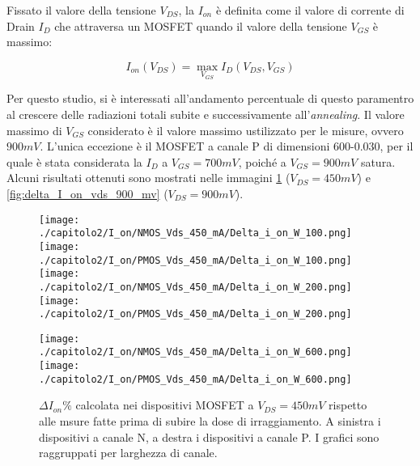 Fissato il valore della tensione $V_{DS}$, la $I_{on}$ è definita come il valore di corrente di Drain $I_D$ che attraversa un MOSFET quando il valore della tensione $V_{GS}$ è massimo:

\begin{equation}
    I_{on}(V_{DS}) = \max_{V_{GS}} I_D(V_{DS},V_{GS})
\end{equation}

Per questo studio, si è interessati all'andamento percentuale di questo paramentro al crescere delle radiazioni totali subite e successivamente all'\emph{annealing}. Il valore massimo di $V_{GS}$ considerato è il valore massimo ustilizzato per le misure, ovvero $900 mV$. L'unica eccezione è il MOSFET a canale P di dimensioni 600-0.030, per il quale è stata considerata la $I_D$ a $V_{GS} = 700 mV$, poiché a $V_{GS} = 900mV$ satura. Alcuni risultati ottenuti sono mostrati nelle immagini \ref{fig:delta_I_on_vds_450_mv} ($V_{DS} = 450 mV$) e \ref{fig:delta_I_on_vds_900_mv} ($V_{DS} = 900 mV$).

\begin{figure}[h]
    \centering
    \texttt{[image: ./capitolo2/I\_on/NMOS\_Vds\_450\_mA/Delta\_i\_on\_W\_100.png]}
    \texttt{[image: ./capitolo2/I\_on/PMOS\_Vds\_450\_mA/Delta\_i\_on\_W\_100.png]}\\
    \vspace{0.2cm}
    \texttt{[image: ./capitolo2/I\_on/NMOS\_Vds\_450\_mA/Delta\_i\_on\_W\_200.png]}
    \texttt{[image: ./capitolo2/I\_on/PMOS\_Vds\_450\_mA/Delta\_i\_on\_W\_200.png]}\\
    \vspace{0.2cm}

    \texttt{[image: ./capitolo2/I\_on/NMOS\_Vds\_450\_mA/Delta\_i\_on\_W\_600.png]}
    \texttt{[image: ./capitolo2/I\_on/PMOS\_Vds\_450\_mA/Delta\_i\_on\_W\_600.png]}

    \caption[Dati $\Delta I_{on}\%$ a $V_{DS}=440mV$ ]{$\Delta I_{on}\%$ calcolata nei dispositivi MOSFET a $V_{DS} = 450mV$ rispetto alle msure fatte prima di subire la dose di irraggiamento. A sinistra i dispositivi a canale N, a destra i dispositivi a canale P. I grafici sono raggruppati per larghezza di canale.}
    \label{fig:delta_I_on_vds_450_mv}

\end{figure}

